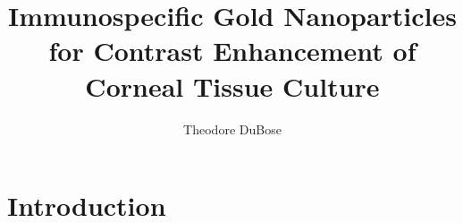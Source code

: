 \documentclass{hmcthesis}
\title{Immunospecific Gold Nanoparticles for Contrast Enhancement of Corneal Tissue Culture}
\author{Theodore DuBose}
\begin{document}
\frontmatter


\maketitle




\begin{abstract}

\end{abstract}




\begin{acknowledgments}
  
\end{acknowledgments}





\tableofcontents
\listoffigures
\listoftables
\mainmatter
\chapter{Introduction}
\label{introduction}
\end{document}
